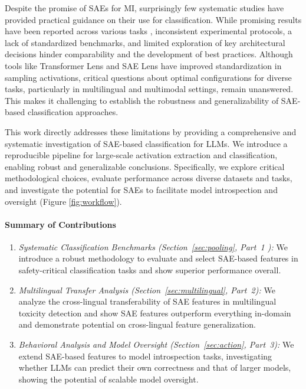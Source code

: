 Despite the promise of SAEs for MI, surprisingly few systematic studies have provided practical guidance on their use for classification. While promising results have been reported across various tasks \cite{features_as_classifiers, sae_probing, sae_features_llava}, inconsistent experimental protocols, a lack of standardized benchmarks, and limited exploration of key architectural decisions hinder comparability and the development of best practices. Although tools like Transformer Lens \cite{nanda2022transformerlens} and SAE Lens \cite{bloom2024saetrainingcodebase} have improved standardization in sampling activations, critical questions about optimal configurations for diverse tasks, particularly in multilingual and multimodal settings, remain unanswered. This makes it challenging to establish the robustness and generalizability of SAE-based classification approaches.


This work directly addresses these limitations by providing a comprehensive and systematic investigation of SAE-based classification for LLMs. We introduce a reproducible pipeline for large-scale activation extraction and classification, enabling robust and generalizable conclusions. Specifically, we explore critical methodological choices, evaluate performance across diverse datasets and tasks, and investigate the potential for SAEs to facilitate model introspection and oversight (Figure \ref{fig:workflow}).


\paragraph{Summary of Contributions}
\begin{enumerate}[itemsep=-1.7pt,topsep=1.5pt]
    \item \textit{Systematic Classification Benchmarks (Section~\ref{sec:pooling}, Part~1 ):} We introduce a robust methodology to evaluate and select SAE-based features in safety-critical classification tasks and show superior performance overall. 
    
    \item \textit{Multilingual Transfer Analysis (Section~\ref{sec:multilingual}, Part~2):} We analyze the cross-lingual transferability of SAE features in multilingual toxicity detection and show SAE features outperform everything in-domain and demonstrate potential on cross-lingual feature generalization.
    
    \item \textit{Behavioral Analysis and Model Oversight (Section~\ref{sec:action}, Part~3):} We extend SAE-based features to model introspection tasks, investigating whether LLMs can predict their own correctness and that of larger models, showing the potential of scalable model oversight.
    

\end{enumerate}

